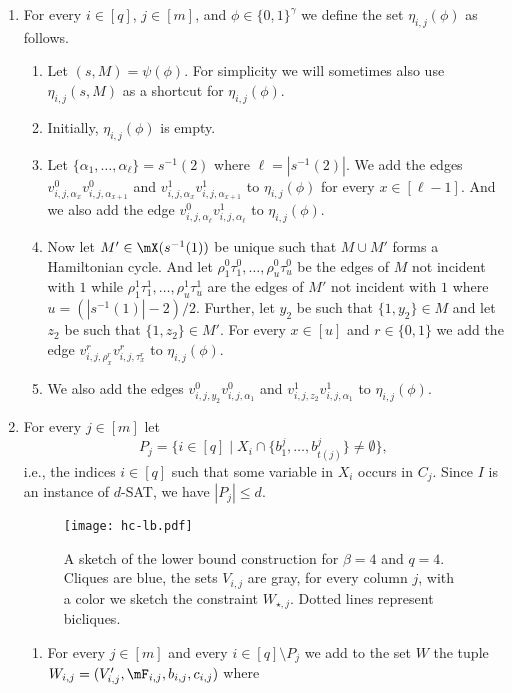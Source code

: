 \documentclass[a4paper,UKenglish,cleveref, autoref, thm-restate]{lipics-v2021}
\begin{document}
\begin{enumerate}
 \item For every $i \in [q]$, $j \in [m]$, and $\phi \in \{0,1\}^\gamma$ we define the set $\eta_{i,j}(\phi)$ as follows. 
 \begin{enumerate}
		\item Let $(s, M) = \psi(\phi)$. For simplicity we will sometimes also use $\eta_{i,j}(s, M)$ as a shortcut for $\eta_{i,j}(\phi)$.
		\item Initially, $\eta_{i,j}(\phi)$ is empty.
		\item Let $\{\alpha_1, \dots, \alpha_\ell\} = s^{-1}(2)$ where $\ell = |s^{-1}(2)|$. We add the edges $v_{i,j,\alpha_x}^0 v_{i,j,\alpha_{x+1}}^0$ and $v_{i,j,\alpha_x}^1 v_{i,j,\alpha_{x+1}}^1$ to $\eta_{i,j}(\phi)$ for every $x \in [\ell-1]$. And we also add the edge $v_{i,j,\alpha_\ell}^0 v_{i,j,\alpha_\ell}^1$ to $\eta_{i,j}(\phi)$.
		\item Now let $M' \in \mX(s^{-1}(1))$ be unique such that $M \cup M'$ forms a Hamiltonian cycle. 
		And let $\rho^0_1 \tau^0_1, \dots, \rho^0_u \tau^0_u$ be the edges of $M$ not incident with $1$ while $\rho^1_1 \tau^1_1, \dots, \rho^1_u \tau^1_u$ are the edges of $M'$ not incident with $1$ where $u = (|s^{-1}(1)| - 2)/2$.
		Further, let $y_2$ be such that $\{1, y_2\} \in M$ and let $z_2$ be such that $\{1, z_2\} \in M'$.
		For every $x \in [u]$ and $r \in \{0, 1\}$ we add the edge $v^r_{i,j,\rho^r_x} v^r_{i,j,\tau^r_x}$ to $\eta_{i,j}(\phi)$.
		\item We also add the edges $v_{i,j,y_2}^0 v_{i,j,\alpha_1}^0$ and $v_{i,j,z_2}^1 v_{i,j,\alpha_1}^1$ to $\eta_{i,j}(\phi)$.
 \end{enumerate}
 \item For every $j \in [m]$ let 
 \[
 	P_j = \{i \in [q] \mid X_i \cap \{b_1^j, \dots, b_{t(j)}^j\} \neq \emptyset \},
\]
i.e., the indices $i \in [q]$  such that some variable in $X_i$ occurs in $C_j$. Since $I$ is an instance of $d$-\textsc{SAT}, we have $|P_j| \leq d$. 
\begin{figure}[t]
	\centering
	\texttt{[image: hc-lb.pdf]}
	\caption{A sketch of the lower bound construction for $\beta = 4$ and $q = 4$. Cliques are blue, the sets $V_{i,j}$ are gray, for every column $j$, with a color we sketch the constraint $W_{\star, j}$. Dotted lines represent bicliques.}
	\label{fig:hc-lb}
\end{figure}
\begin{enumerate}
 \item\label{item:constraints-no-clause} For every $j \in [m]$ and every $i \in [q] \setminus P_j$ we add to the set $W$ the tuple $W_{i,j} = (V'_{i,j}, \mF_{i,j}, b_{i,j}, c_{i,j})$ where 

\end{enumerate}
\end{enumerate}
\end{document}
